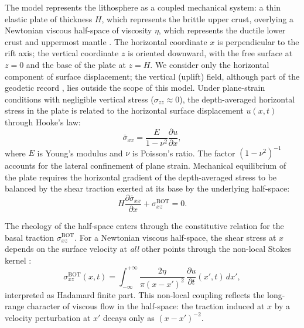 \documentclass[extra]{gji}
\begin{document}
The model represents the lithosphere as a coupled mechanical system: a thin elastic plate of thickness $H$, which represents the brittle upper
crust, overlying a Newtonian viscous half-space of viscosity $\eta$, which
represents the ductile lower crust and uppermost mantle
\citep[e.g.,][]{hetland2005postseismic,hetland2006thesis}. The horizontal 
coordinate $x$ is perpendicular to the rift axis; the vertical coordinate $z$ is oriented downward, with the free surface at $z = 0$ 
and the base of the plate at $z = H$. We consider only the horizontal component of surface displacement; the vertical (uplift) field, although
part of the geodetic record \citep{hofton1996post,nooner2009post}, lies outside the scope of this model. Under plane-strain conditions with negligible 
vertical stress ($\sigma_{zz}\approx 0$), the depth-averaged horizontal stress in the plate is related to the horizontal surface displacement 
$u(x,t)$ through Hooke's law:
\begin{equation}
\bar{\sigma}_{xx} = \frac{E}{1-\nu^2}\frac{\partial u}{\partial x},
\label{eq:hookean}
\end{equation}
where $E$ is Young's modulus and $\nu$ is Poisson's ratio. The factor
$(1-\nu^2)^{-1}$ accounts for the lateral confinement of plane strain.
Mechanical equilibrium of the plate requires the horizontal gradient of the
depth-averaged stress to be balanced by the shear traction exerted at its base
by the underlying half-space:
\begin{equation}
H\frac{\partial\bar{\sigma}_{xx}}{\partial x} + \sigma_{xz}^{\text{BOT}} = 0.
\label{eq:equil}
\end{equation}

The rheology of the half-space enters through the constitutive
relation for the basal traction $\sigma_{xz}^{\text{BOT}}$. For a Newtonian
viscous half-space, the shear stress at $x$ depends on the surface velocity
at \emph{all} other points through the non-local Stokes kernel
\citep{savage1978asthenosphere}:
\begin{equation}
\sigma_{xz}^{\text{BOT}}(x,t) =
  \int_{-\infty}^{+\infty}\frac{2\eta}{\pi(x-x')^2}\,
  \frac{\partial u}{\partial t}(x',t)\,dx',
\label{eq:stokes}
\end{equation}
interpreted as Hadamard finite part. This non-local coupling reflects the
long-range character of viscous flow in the half-space: the traction
induced at $x$ by a velocity perturbation at $x'$ decays only as
$(x-x')^{-2}$.
\end{document}
